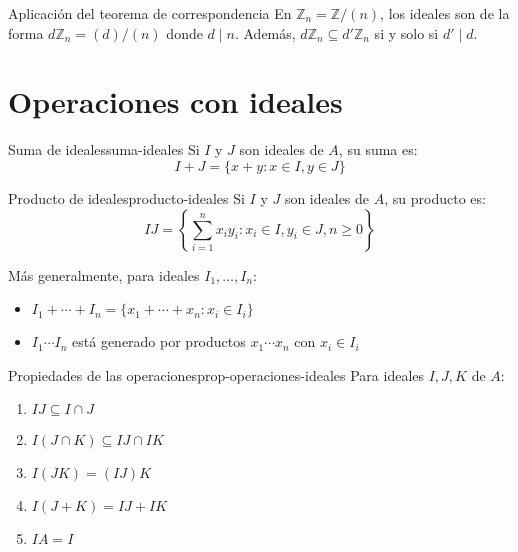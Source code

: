 \begin{example}{Aplicación del teorema de correspondencia}{}
    En \(\mathbb{Z}_n = \mathbb{Z}/(n)\), los ideales son de la forma \(d\mathbb{Z}_n = (d)/(n)\) donde \(d \mid n\). Además, \(d\mathbb{Z}_n \subseteq d'\mathbb{Z}_n\) si y solo si \(d' \mid d\).
\end{example}

\clearpage

\section{Operaciones con ideales}

\begin{definition}{Suma de ideales}{suma-ideales}
    Si \(I\) y \(J\) son ideales de \(A\), su {suma} es:
    \[
    I + J = \{x + y : x \in I, y \in J\}
    \]
\end{definition}

\begin{definition}{Producto de ideales}{producto-ideales}
    Si \(I\) y \(J\) son ideales de \(A\), su {producto} es:
    \[
    IJ = \left\{\sum_{i=1}^n x_i y_i : x_i \in I, y_i \in J, n \geq 0\right\}
    \]
\end{definition}

\begin{remark}
    Más generalmente, para ideales \(I_1, \ldots, I_n\):
    \begin{itemize}
        \item \(I_1 + \cdots + I_n = \{x_1 + \cdots + x_n : x_i \in I_i\}\)
        \item \(I_1 \cdots I_n\) está generado por productos \(x_1 \cdots x_n\) con \(x_i \in I_i\)
    \end{itemize}
\end{remark}

\begin{proposition}{Propiedades de las operaciones}{prop-operaciones-ideales}
    Para ideales \(I, J, K\) de \(A\):
    \begin{enumerate}
        \item \(IJ \subseteq I \cap J\)
        \item \(I(J \cap K) \subseteq IJ \cap IK\)
        \item \(I(JK) = (IJ)K\)
        \item \(I(J + K) = IJ + IK\)
        \item \(IA = I\)
    \end{enumerate}
\end{proposition}

